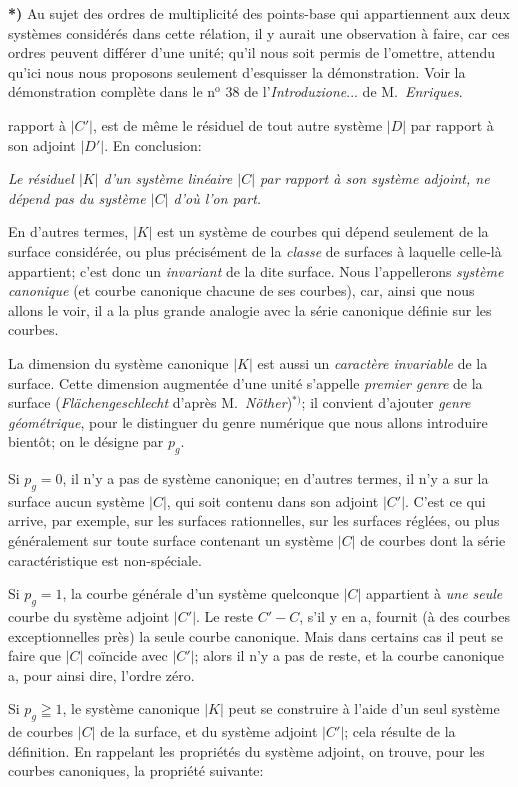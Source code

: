 \documentclass{article}
\begin{document}
\textbf{*)} Au sujet des ordres de multiplicité des points-base qui appartiennent aux deux systèmes considérés dans cette rélation, il y aurait une observation à faire, car ces ordres peuvent différer d'une unité; qu'il nous soit permis de l'omettre, attendu qu'ici nous nous proposons seulement d'esquisser la démonstration. Voir la démonstration complète dans le n${}^{\text{o}}$ 38 de l'\emph{Introduzione}... de M.\ \emph{Enriques}.

rapport à $|C'|$, est de même le résiduel de tout autre système $|D|$ par rapport à son adjoint $|D'|$. En conclusion:

\emph{Le résiduel $|K|$ d'un système linéaire $|C|$ par rapport à son système adjoint, ne dépend pas du système $|C|$ d'où l'on part.}

En d'autres termes, $|K|$ est un système de courbes qui dépend seulement de la surface considérée, ou plus précisément de la \emph{classe} de surfaces à laquelle celle-là appartient; c'est donc un \emph{invariant} de la dite surface. Nous l'appellerons \emph{système canonique} (et courbe canonique chacune de ses courbes), car, ainsi que nous allons le voir, il a la plus grande analogie avec la série canonique définie sur les courbes.

La dimension du système canonique $|K|$ est aussi un \emph{caractère invariable} de la surface. Cette dimension augmentée d'une unité s'appelle \emph{premier genre} de la surface (\emph{Flächengeschlecht} d'après M.\ \emph{Nöther})${}^{*)}$; il convient d'ajouter \emph{genre géométrique}, pour le distinguer du genre numérique que nous allons introduire bientôt; on le désigne par $p_{g}$.

Si $p_{g} = 0$, il n'y a pas de système canonique; en d'autres termes, il n'y a sur la surface aucun système $|C|$, qui soit contenu dans son adjoint $|C'|$. C'est ce qui arrive, par exemple, sur les surfaces rationnelles, sur les surfaces réglées, ou plus généralement sur toute surface contenant un système $|C|$ de courbes dont la série caractéristique est non-spéciale.

Si $p_{g} = 1$, la courbe générale d'un système quelconque $|C|$ appartient à \emph{une seule} courbe du système adjoint $|C'|$. Le reste $C' - C$, s'il y en a, fournit (à des courbes exceptionnelles près) la seule courbe canonique. Mais dans certains cas il peut se faire que $|C|$ coïncide avec $|C'|$; alors il n'y a pas de reste, et la courbe canonique a, pour ainsi dire, l'ordre zéro.

Si $p_{g} \geqq 1$, le système canonique $|K|$ peut se construire à l'aide d'un seul système de courbes $|C|$ de la surface, et du système adjoint $|C'|$; cela résulte de la définition. En rappelant les propriétés du système adjoint, on trouve, pour les courbes canoniques, la propriété suivante:
\end{document}
